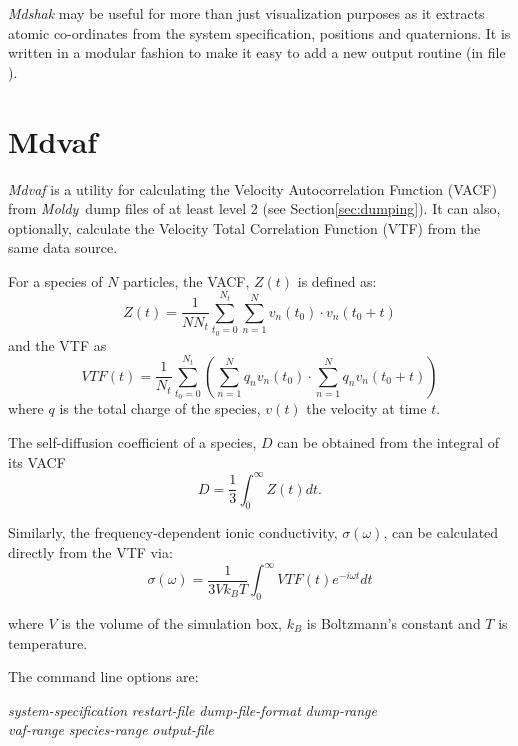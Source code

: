 \documentclass[a4paper,twoside]{report}
\newcommand{\moldy}{\emph{Moldy}}
\begin{document}
\emph{Mdshak} may be useful for more than just visualization purposes
as it extracts atomic co-ordinates from the system specification,
positions and quaternions.  It is written in a modular fashion
to make it easy to add a new output routine (in file ).

\section{Mdvaf}%
\emph{Mdvaf} is a utility for calculating the Velocity Autocorrelation 
Function (VACF) from \moldy\ dump files of at least level 2 (see 
Section\ref{sec:dumping}). It can also, optionally, calculate the Velocity 
Total Correlation Function (VTF) from the same data source.

For a species of $N$ particles, the VACF, $Z(t)$ is defined as:
\begin{equation}
  Z(t) = \frac{1}{N N_t} \sum_{t_0=0}^{N_t} \sum_{n=1}^N v_n(t_0) \cdot v_n(t_0 + t)
\end{equation}
and the VTF as
\begin{equation}
  VTF(t)= \frac{1}{N_t} \sum_{t_0=0}^{N_t} \left ( \sum_{n=1}^N q_n v_n(t_0) 
  \cdot  \sum_{n=1}^N  q_n v_n(t_0 + t) \right )
\end{equation}
where $q$ is the total charge of the species, $v(t)$ the
velocity at time $t$.

The self-diffusion coefficient of a species, $D$ can be
obtained from the integral of its VACF
\begin{equation}
  D = \frac{1}{3} \int_0^\infty Z(t) dt .
\end{equation}

Similarly, the frequency-dependent ionic conductivity, $\sigma(\omega)$, can
be calculated directly from the VTF via:
\begin{equation}
  \sigma(\omega) = \frac{1}{3 V k_B T}    \int_0^\infty VTF(t) e^{-i \omega t} dt
\end{equation}

where $V$ is the volume of the simulation box, $k_{B}$ is Boltzmann's
constant and $T$ is temperature.

The command line options are:

\begin{center}
\Lit{[-s} \textit{system-specification} \Lit{|}
 \textit{restart-file} \Lit{]}
\Lit{[-d} \textit{dump-file-format}\Lit{]}
\Lit{[-t} \textit{dump-range}\Lit{]} \\
\Lit{[-v} \textit{vaf-range}\Lit{]}
\Lit{[-g} \textit{species-range}\Lit{]} 
\Lit{[-c]}
\Lit{[-q]} 
\Lit{[-o} \textit{output-file}\Lit{]}
\end{center}
\end{document}
